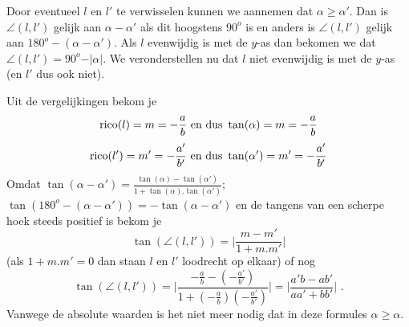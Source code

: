 Door eventueel $l$ en $l'$ te verwisselen kunnen we aannemen dat $\alpha \geq \alpha '$.
Dan is $\angle (l,l')$ gelijk aan $\alpha - \alpha '$ als dit hoogstens $90^o$ is en anders is $\angle (l,l')$ gelijk aan $180^o-(\alpha - \alpha ')$.
Als $l$ evenwijdig is met de $y$-as dan bekomen we dat $\angle (l,l')=90^o-\vert \alpha \vert$.
We veronderstellen nu dat $l$ niet evenwijdig is met de $y$-as (en $l'$ dus ook niet).

Uit de vergelijkingen bekom je
\[
\operatorname{rico} (l)=m=-\frac {a}{b} \text { en dus } \tan (\alpha )=m=-\frac{a}{b}
\]
\[
\operatorname{rico} (l')=m'=-\frac{a'}{b'} \text { en dus } \tan(\alpha ')=m'=-\frac{a'}{b'}
\]
Omdat $\tan (\alpha -\alpha ')=\frac{\tan (\alpha)-\tan (\alpha ')}{1+\tan (\alpha).\tan (\alpha ')}$; $\tan (180^o-(\alpha -\alpha '))=-\tan (\alpha -\alpha ')$ en de tangens van een scherpe hoek steeds positief is bekom je
\[
\tan (\angle (l,l'))=\vert \frac{m-m'}{1+m.m'} \vert
\]
(als $1+m.m'=0$ dan staan $l$ en $l'$ loodrecht op elkaar) of nog
\[
\tan (\angle (l,l'))=\vert \frac{-\frac{a}{b}-(-\frac{a'}{b'})}{1+(-\frac{a}{b})(-\frac{a'}{b'})} \vert = \vert \frac{a'b-ab'}{aa'+bb'} \vert \text { .}
\]
Vanwege de absolute waarden is het niet meer nodig dat in deze formules $\alpha \geq \alpha$.\\


